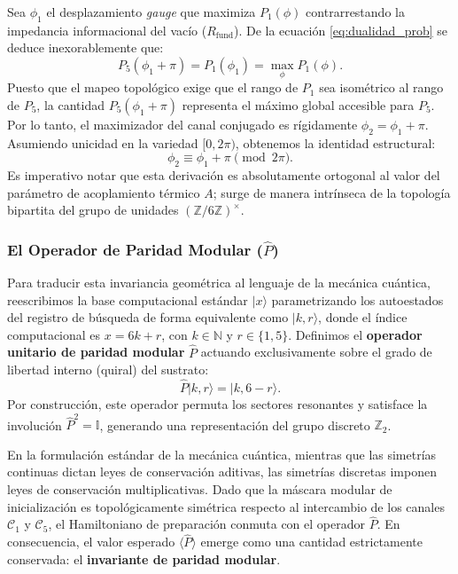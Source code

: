 \documentclass[12pt,a4paper]{article}
\theoremstyle{plain}
\theoremstyle{definition}
\theoremstyle{remark}
\begin{document}
Sea $\phi_1$ el desplazamiento \textit{gauge} que maximiza $P_1(\phi)$ contrarrestando la impedancia informacional del vacío ($R_{\text{fund}}$). De la ecuación \eqref{eq:dualidad_prob} se deduce inexorablemente que:
\begin{equation}
P_5(\phi_1+\pi) = P_1(\phi_1) = \max_{\phi} P_1(\phi).
\end{equation}
Puesto que el mapeo topológico exige que el rango de $P_1$ sea isométrico al rango de $P_5$, la cantidad $P_5(\phi_1+\pi)$ representa el máximo global accesible para $P_5$. Por lo tanto, el maximizador del canal conjugado es rígidamente $\phi_2 = \phi_1 + \pi$. Asumiendo unicidad en la variedad $[0, 2\pi)$, obtenemos la identidad estructural:
\begin{equation}
\phi_2 \equiv \phi_1 + \pi \pmod{2\pi}.
\label{eq:relacion_fases}
\end{equation}
Es imperativo notar que esta derivación es absolutamente ortogonal al valor del parámetro de acoplamiento térmico $A$; surge de manera intrínseca de la topología bipartita del grupo de unidades $(\mathbb{Z}/6\mathbb{Z})^{\times}$.

\subsubsection*{El Operador de Paridad Modular ($\hat{P}$)}

Para traducir esta invariancia geométrica al lenguaje de la mecánica cuántica, reescribimos la base computacional estándar $|x\rangle$ parametrizando los autoestados del registro de búsqueda de forma equivalente como $|k, r\rangle$, donde el índice computacional es $x = 6k + r$, con $k \in \mathbb{N}$ y $r \in \{1, 5\}$. Definimos el \textbf{operador unitario de paridad modular} $\hat{P}$ actuando exclusivamente sobre el grado de libertad interno (quiral) del sustrato:
\begin{equation}
\hat{P} |k, r\rangle = |k, 6-r\rangle.
\end{equation}
Por construcción, este operador permuta los sectores resonantes y satisface la involución $\hat{P}^2 = \mathbb{I}$, generando una representación del grupo discreto $\mathbb{Z}_2$. 

En la formulación estándar de la mecánica cuántica, mientras que las simetrías continuas dictan leyes de conservación aditivas, las simetrías discretas imponen leyes de conservación multiplicativas. Dado que la máscara modular de inicialización es topológicamente simétrica respecto al intercambio de los canales $\mathcal{C}_1$ y $\mathcal{C}_5$, el Hamiltoniano de preparación conmuta con el operador $\hat{P}$. En consecuencia, el valor esperado $\langle \hat{P} \rangle$ emerge como una cantidad estrictamente conservada: el \textbf{invariante de paridad modular}.
\end{document}
